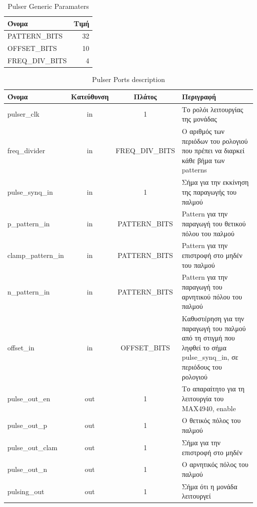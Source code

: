 \documentclass[12pt,a4paper]{book}
\begin{document}
\begin{table}
\center
\begin{tabular}{|l|r|}
\hline 
Όνομα & Τιμή \\ 
\hline 
\hline 
PATTERN\_BITS & 32 \\ 
\hline 
OFFSET\_BITS & 10 \\ 
\hline 
FREQ\_DIV\_BITS & 4 \\ 
\hline 
\end{tabular} 
\caption{Pulser Generic Paramaters}
\label{pulser_generics} 
\end{table} 


\begin{table}
\begin{tabularx}{\linewidth}{|l|c|c|X|}
\hline 
Όνομα & Κατεύθυνση & Πλάτος & Περιγραφή \\ 
\hline 
\hline 
pulser\_clk & in & 1 & Το ρολόι λειτουργίας της μονάδας \\ 
\hline 
freq\_divider & in & FREQ\_DIV\_BITS & Ο αριθμός των περιόδων του ρολογιού που πρέπει να διαρκεί κάθε βήμα των patterns \\ 
\hline 
pulse\_synq\_in & in & 1 & Σήμα για την εκκίνηση της παραγωγής του παλμού \\ 
\hline 
p\_pattern\_in & in & PATTERN\_BITS & Pattern για την παραγωγή του θετικού πόλου του παλμού \\ 
\hline 
clamp\_pattern\_in & in & PATTERN\_BITS & Pattern για την επιστροφή στο μηδέν του παλμού \\ 
\hline 
n\_pattern\_in & in & PATTERN\_BITS & Pattern για την παραγωγή του αρνητικού πόλου του παλμού \\ 
\hline 
offset\_in & in & OFFSET\_BITS & Καθυστέρηση για την παραγωγή του παλμού από τη στιγμή που ληφθεί το σήμα pulse\_synq\_in, σε περιόδους του ρολογιού \\ 
\hline 
pulse\_out\_en & out & 1 & Το απαραίτητο για τη λειτουργία του MAX4940, enable \\ 
\hline 
pulse\_out\_p & out & 1 & Ο θετικός πόλος του παλμού \\ 
\hline 
pulse\_out\_clam & out & 1 & Σήμα για την επιστροφή στο μηδέν \\ 
\hline 
pulse\_out\_n & out & 1 & Ο αρνητικός πόλος του παλμού \\ 
\hline 
pulsing\_out & out & 1 & Σήμα ότι η μονάδα λειτουργεί \\ 
\hline 
\end{tabularx} 
\caption{Pulser Ports description}
\label{pulser_ports} 
\end{table} 
\end{document}
